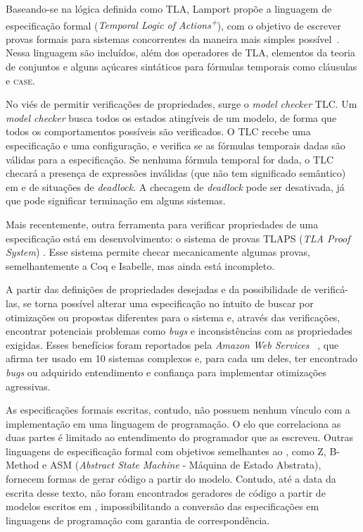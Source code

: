 Baseando-se na lógica definida como TLA, Lamport propõe a linguagem de especificação formal \TLA (\textit{Temporal Logic of Actions\textsuperscript{+}}), com o objetivo de escrever provas formais para sistemas concorrentes da maneira mais simples possível~\cite{tlahistory}. Nessa linguagem são incluídos, além dos operadores de TLA, elementos da teoria de conjuntos e alguns açúcares sintáticos para fórmulas temporais como cláusulas \IF e \textsc{case}.

No viés de permitir verificações de propriedades, surge o \textit{model checker}
TLC. Um \textit{model checker} busca todos os estados atingíveis de um modelo,
de forma que todos os comportamentos possíveis são verificados. O TLC recebe uma
especificação e uma configuração, e verifica se as fórmulas temporais dadas são
válidas para a especificação. Se nenhuma fórmula temporal for dada, o TLC
checará a presença de expressões inválidas (que não tem significado semântico) em \TLA e de situações de \textit{deadlock}. A checagem de \textit{deadlock} pode ser desativada, já que pode significar terminação em alguns sistemas.

Mais recentemente, outra ferramenta para verificar propriedades de uma especificação está em desenvolvimento: o sistema de provas TLAPS (\textit{TLA Proof System}) \cite{tlaps2010}. Esse sistema permite checar mecanicamente algumas provas, semelhantemente a Coq e Isabelle, mas ainda está incompleto.

A partir das definições de propriedades desejadas e da possibilidade de verificá-las, se torna possível alterar uma especificação no intuito de buscar por otimizações ou propostas diferentes para o sistema e, através das verificações, encontrar potenciais pro\-ble\-mas como \textit{bugs} e inconsistências com as propriedades exigidas. Esses benefícios foram reportados pela \textit{Amazon Web Services} ~\cite{amazon}, que afirma ter usado \TLA em 10 sistemas complexos e, para cada um deles, ter encontrado \textit{bugs} ou adquirido entendimento e confiança para implementar otimizações agressivas.

As especificações formais escritas, contudo, não possuem nenhum vínculo com a implementação em uma linguagem de programação. O elo que correlaciona as duas partes é limitado ao entendimento do programador que as escreveu. Outras linguagens de especificação formal com objetivos semelhantes ao \TLAA, como Z, B-Method e ASM (\textit{Abstract State Machine} - Máquina de Estado Abstrata), fornecem formas de gerar código a partir do modelo. Contudo, até a data da escrita desse texto, não foram encontrados geradores de código a partir de modelos escritos em \TLAA, impossibilitando a conversão das especificações em linguagens de programação com garantia de correspondência.

